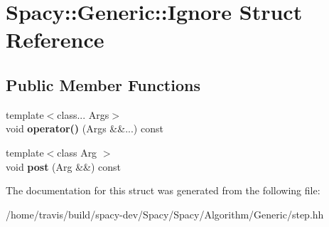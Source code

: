\hypertarget{structSpacy_1_1Generic_1_1Ignore}{\section{Spacy\-:\-:Generic\-:\-:Ignore Struct Reference}
\label{structSpacy_1_1Generic_1_1Ignore}
}
\subsection*{Public Member Functions}
\begin{DoxyCompactItemize}
\item 
\hypertarget{structSpacy_1_1Generic_1_1Ignore_ac12f69ea973294c5d25f24d1a7d2f50b}{{\footnotesize template$<$class... Args$>$ }\\void {\bfseries operator()} (Args \&\&...) const }\label{structSpacy_1_1Generic_1_1Ignore_ac12f69ea973294c5d25f24d1a7d2f50b}

\item 
\hypertarget{structSpacy_1_1Generic_1_1Ignore_a1e9c15cacc52b4da38ad4745b275acb9}{{\footnotesize template$<$class Arg $>$ }\\void {\bfseries post} (Arg \&\&) const }\label{structSpacy_1_1Generic_1_1Ignore_a1e9c15cacc52b4da38ad4745b275acb9}

\end{DoxyCompactItemize}


The documentation for this struct was generated from the following file\-:\begin{DoxyCompactItemize}
\item 
/home/travis/build/spacy-\/dev/\-Spacy/\-Spacy/\-Algorithm/\-Generic/step.\-hh\end{DoxyCompactItemize}
